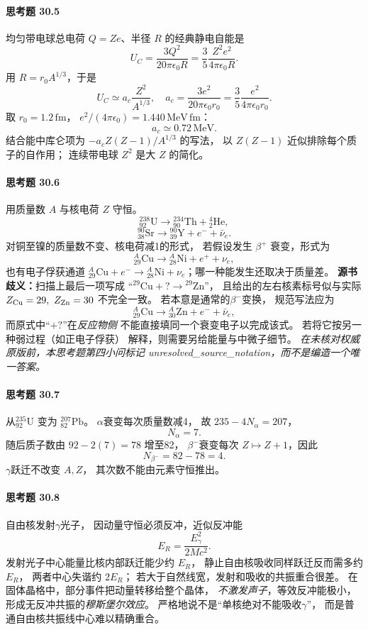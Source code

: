 \paragraph{思考题 30.5}
均匀带电球总电荷 \(Q=Ze\)、半径 \(R\)
的经典静电自能是
\[
U_C=\frac{3Q^2}{20\pi\epsilon_0R}
=\frac35\frac{Z^2e^2}{4\pi\epsilon_0R}.
\]
用 \(R=r_0A^{1/3}\)，于是
\[
\boxed{U_C\simeq a_c\frac{Z^2}{A^{1/3}},
\quad a_c=\frac{3e^2}{20\pi\epsilon_0r_0}
=\frac35\frac{e^2}{4\pi\epsilon_0r_0}}.
\]
取 \(r_0=1.2\,\mathrm{fm}\)，
\(e^2/(4\pi\epsilon_0)=1.440\,\mathrm{MeV\,fm}\)：
\[
\boxed{a_c\simeq0.72\,\mathrm{MeV}}.
\]
结合能中库仑项为
\(-a_cZ(Z-1)/A^{1/3}\) 的写法，
以 \(Z(Z-1)\) 近似排除每个质子的自作用；
连续带电球 \(Z^2\) 是大 \(Z\) 的简化。

\paragraph{思考题 30.6}
用质量数 \(A\) 与核电荷 \(Z\) 守恒。
\[
\boxed{{}^{238}_{92}\mathrm U
\to{}^{234}_{90}\mathrm{Th}
+{}^{4}_{2}\mathrm{He}},
\]
\[
\boxed{{}^{90}_{38}\mathrm{Sr}
\to{}^{90}_{39}\mathrm Y
+e^-+\bar\nu_e}.
\]
对铜至镍的质量数不变、核电荷减1的形式，
若假设发生 \(\beta^+\) 衰变，形式为
\[
\boxed{{}^{A}_{29}\mathrm{Cu}
\to{}^{A}_{28}\mathrm{Ni}
+e^++\nu_e},
\]
也有电子俘获通道
\({}^{A}_{29}\mathrm{Cu}+e^-\to{}^{A}_{28}\mathrm{Ni}
+\nu_e\)；哪一种能发生还取决于质量差。
\textbf{源书歧义：}扫描上最后一项写成
“\({}^{29}\mathrm{Cu}+?\to{}^{29}\mathrm{Zn}\)”，
且给出的左右核素标号似与实际
\(Z_{\rm Cu}=29,\ Z_{\rm Zn}=30\) 不完全一致。
若本意是通常的\(\beta^-\)变换，
规范写法应为
\[
\boxed{{}^{A}_{29}\mathrm{Cu}
\to{}^{A}_{30}\mathrm{Zn}
+e^-+\bar\nu_e},
\]
而原式中“\(+?\)”在\emph{反应物侧}
不能直接填同一个衰变电子以完成该式。
若将它按另一种弱过程（如正电子俘获）
解释，则需要另给能量与中微子细节。
\emph{在未核对权威原版前，本思考题第四小问标记
unresolved\_source\_notation，而不是编造一个唯一答案。}

\paragraph{思考题 30.7}
从\({}^{235}_{92}\mathrm U\) 变为
\({}^{207}_{82}\mathrm{Pb}\)。
\(\alpha\)衰变每次质量数减4，
故
\(235-4N_\alpha=207\)，
\[
\boxed{N_\alpha=7}.
\]
随后质子数由
\(92-2(7)=78\) 增至82，
\(\beta^-\)衰变每次
\(Z\mapsto Z+1\)，因此
\[
\boxed{N_{\beta^-}=82-78=4}.
\]
\(\gamma\)跃迁不改变 \(A,Z\)，
其次数不能由元素守恒推出。

\paragraph{思考题 30.8}
自由核发射\(\gamma\)光子，
因动量守恒必须反冲，近似反冲能
\[
\boxed{E_R=\frac{E_\gamma^2}{2Mc^2}}.
\]
发射光子中心能量比核内部跃迁能少约 \(E_R\)，
静止自由核吸收同样跃迁反而需多约 \(E_R\)，
两者中心失谐约 \(2E_R\)；
若大于自然线宽，发射和吸收的共振重合很差。
在固体晶格中，部分事件把动量转移给整个晶体，
\emph{不激发声子}，等效反冲能极小，
形成无反冲共振的\emph{穆斯堡尔效应}。
严格地说不是“单核绝对不能吸收\(\gamma\)”，
而是普通自由核共振线中心难以精确重合。

